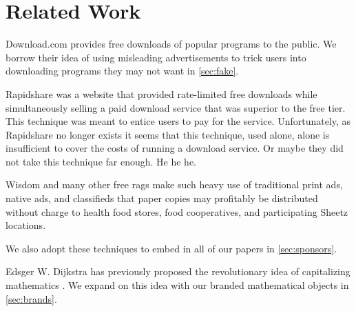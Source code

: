 \section{Related Work}
\label{sec:related}

Download.com \cite{download-com} provides free downloads of popular programs to
the public.
We borrow their idea of using misleading advertisements to trick users into
downloading programs they may not want in \autoref{sec:fake}.

Rapidshare \cite{rapidshare} was a website that provided rate-limited free
downloads while simultaneously selling a paid download service that was
superior to the free tier.
This technique was meant to entice users to pay for the service.
Unfortunately, as Rapidshare no longer exists it seems that this technique, used alone,
alone is insufficient to cover the costs of running a download service. Or maybe they did not take this technique far enough. He he he.

Wisdom \cite{wisdom} and many other free rags make such heavy use of traditional print ads,
native ads, and classifieds that paper copies may profitably be distributed without charge to health food stores, food cooperatives, and participating Sheetz locations.

We also adopt these techniques to embed in all of our papers in
\autoref{sec:sponsors}.

Edsger W. Dijkstra has previously proposed the revolutionary idea of
capitalizing mathematics \cite{cap-math}.
We expand on this idea with our branded mathematical objects in
\autoref{sec:brands}.
